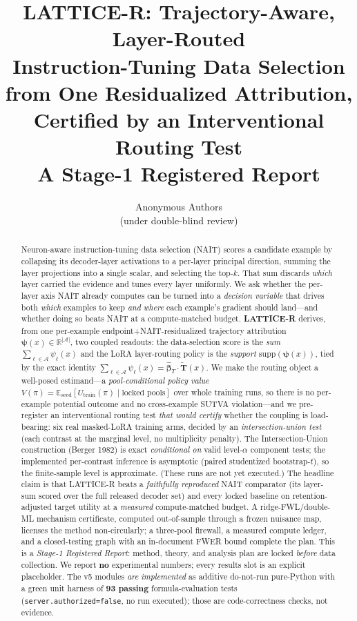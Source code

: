 \documentclass[11pt]{article}
\title{\textbf{LATTICE-R}: Trajectory-Aware, Layer-Routed\\
Instruction-Tuning Data Selection from One Residualized Attribution,\\
Certified by an Interventional Routing Test\\
\large A Stage-1 Registered Report}
\author{Anonymous Authors\\\small (under double-blind review)}
\date{}
\theoremstyle{definition}
\newcommand{\Ttil}{\widetilde{\mathbf{T}}}
\newcommand{\R}{\mathbb{R}}
\newcommand{\E}{\mathbb{E}}
\newcommand{\Aset}{\mathcal{A}}
\newcommand{\psivec}{\bm{\psi}}
\newcommand{\Utr}{U_{\mathrm{train}}}
\newcommand{\Vpol}{V}
\begin{document}
\maketitle

\begin{abstract}
Neuron-aware instruction-tuning data selection (NAIT) scores a candidate example by
collapsing its decoder-layer activations to a per-layer principal direction, summing
the layer projections into a single scalar, and selecting the top-$k$. That sum
discards \emph{which} layer carried the evidence and tunes every layer uniformly. We
ask whether the per-layer axis NAIT already computes can be turned into a
\emph{decision variable} that drives both \emph{which} examples to keep \emph{and}
\emph{where} each example's gradient should land---and whether doing so beats NAIT at a
compute-matched budget. \textbf{LATTICE-R} derives, from one per-example
endpoint+NAIT-residualized trajectory attribution $\psivec(x)\in\R^{|\Aset|}$, two
coupled readouts: the data-selection score is the \emph{sum} $\sum_{\ell\in\Aset}
\psi_\ell(x)$ and the LoRA layer-routing policy is the \emph{support}
$\mathrm{supp}(\psivec(x))$, tied by the exact identity $\sum_{\ell\in\Aset}\psi_\ell(x)
= \hat{\bm\beta}_T\cdot\Ttil(x)$. We make the routing object a well-posed estimand---a
\emph{pool-conditional policy value} $\Vpol(\pi)=\E_{\mathrm{seed}}[\Utr(\pi)\mid\text{locked
pools}]$ over whole training runs, so there is no per-example potential outcome and no
cross-example SUTVA violation---and we pre-register an interventional routing test
\emph{that would certify} whether the coupling is load-bearing: six real masked-LoRA
training arms, decided by an \emph{intersection-union test} (each contrast at the marginal
level, no multiplicity penalty). The Intersection-Union construction
(Berger 1982) is exact \emph{conditional on} valid level-$\alpha$ component tests; the
implemented per-contrast inference is asymptotic (paired studentized bootstrap-$t$), so the
finite-sample level is approximate. (These runs are not yet executed.) The headline
claim is that LATTICE-R beats a \emph{faithfully reproduced} NAIT comparator (its
layer-sum scored over the full released decoder set) and every locked baseline on
retention-adjusted target utility at a \emph{measured} compute-matched budget. A
ridge-FWL/double-ML mechanism certificate, computed out-of-sample through a frozen
nuisance map, licenses the method non-circularly; a three-pool firewall, a measured
compute ledger, and a closed-testing graph with an in-document FWER bound complete the
plan. This is a \emph{Stage-1 Registered Report}: method, theory, and analysis plan are
locked \emph{before} data collection. We report \textbf{no} experimental numbers; every
results slot is an explicit placeholder. The v5 modules \emph{are implemented} as
additive do-not-run pure-Python with a green unit harness of \textbf{93 passing}
formula-evaluation tests (\texttt{server.authorized=false}, no run executed); those are
code-correctness checks, not evidence.
\end{abstract}
\end{document}
